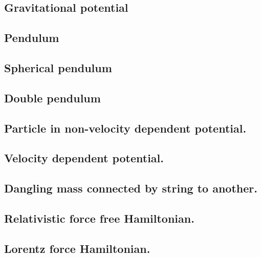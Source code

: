 \subsection{Gravitational potential}

\subsection{Pendulum}

\subsection{Spherical pendulum}

\subsection{Double pendulum}

\subsection{Particle in non-velocity dependent potential.}

\subsection{Velocity dependent potential.}

\subsection{Dangling mass connected by string to another.}

\subsection{Relativistic force free Hamiltonian.}

\subsection{Lorentz force Hamiltonian.}

\EndArticle
